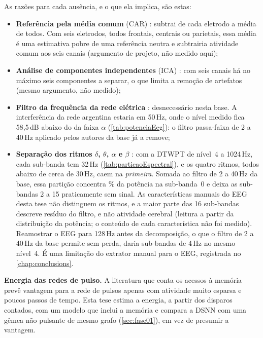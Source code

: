 			\par As razões para cada ausência, e o que ela implica, são estas:
			\begin{itemize}
				\item \textbf{Referência pela média comum} (CAR) \cite{AgarwalPrabhakar2022Ebia,Hernandez-Del-ToroTonatiuh2021TaEB,MOCTEZUMA2019201}: subtrai de cada eletrodo a média de todos. Com seis eletrodos, todos frontais, centrais ou parietais, essa média é uma estimativa pobre de uma referência neutra e subtrairia atividade comum aos seis canais (argumento de projeto, não medido aqui);
				\item \textbf{Análise de componentes independentes} (ICA) \cite{MahapatraNrushinghCharan2022MCoI}: com seis canais há no máximo seis componentes a separar, o que limita a remoção de artefatos (mesmo argumento, não medido);
				\item \textbf{Filtro da frequência da rede elétrica} \cite{MahapatraNrushinghCharan2023Ecoi}: desnecessário nesta base. A interferência da rede argentina estaria em 50\,Hz, onde o nível medido fica 58,5\,dB abaixo do da faixa $\alpha$ (\autoref{tab:potenciaEeg}): o filtro passa-faixa de 2 a 40\,Hz aplicado pelos autores da base já a remove;
				\item \textbf{Separação dos ritmos $\delta$, $\theta$, $\alpha$ e $\beta$} \cite{AgarwalPrabhakar2022Ebia}: com a \ac{DTWPT} de nível~4 a 1024\,Hz, cada sub-banda tem 32\,Hz (\autoref{tab:particaoEspectral}), e os quatro ritmos, todos abaixo de cerca de 30\,Hz, caem na \emph{primeira}. Somada ao filtro de 2 a 40\,Hz da base, essa partição concentra \% da potência na sub-banda~0 e deixa as sub-bandas 2 a 15 praticamente sem sinal. As características manuais do \ac{EEG} desta tese não distinguem os ritmos, e a maior parte das 16 sub-bandas descreve resíduo do filtro, e não atividade cerebral (leitura a partir da distribuição da potência; o conteúdo de cada característica não foi medido). Reamostrar o \ac{EEG} para 128\,Hz antes da decomposição, o que o filtro de 2 a 40\,Hz da base permite sem perda, daria sub-bandas de 4\,Hz no mesmo nível~4. É uma limitação do extrator manual para o \ac{EEG}, registrada no \autoref{chap:conclusions}.
			\end{itemize}

			\par \textbf{Energia das redes de pulso.} A literatura que conta os acessos à memória \cite{dampfhoffer2023snns,yan2024reconsidering} prevê vantagem para a rede de pulsos apenas com atividade muito esparsa e poucos passos de tempo. Esta tese estima a energia, a partir dos disparos contados, com um modelo que inclui a memória \cite{lemaire2022analytical} e compara a \ac{DSNN} com uma gêmea não pulsante de mesmo grafo (\autoref{sec:fase01}), em vez de presumir a vantagem.
			